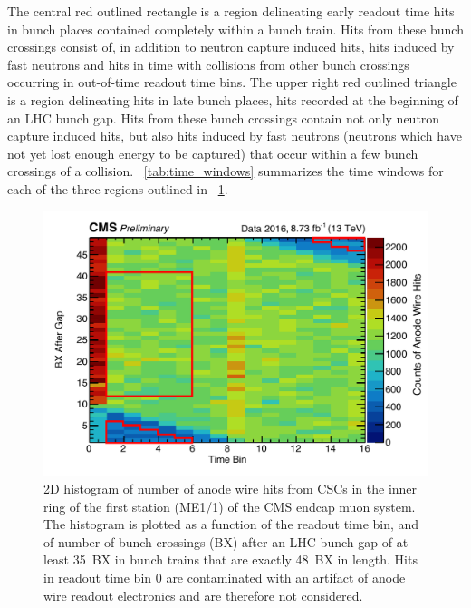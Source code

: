 The central red outlined rectangle is a region delineating early readout time hits in bunch places contained completely within a bunch train. Hits from these bunch crossings consist of, in addition to neutron capture induced hits, hits induced by fast neutrons and hits in time with \pp collisions from other bunch crossings occurring in out-of-time readout time bins. The upper right red outlined triangle is a region delineating hits in late bunch places, \ie hits recorded at the beginning of an LHC bunch gap. Hits from these bunch crossings contain not only neutron capture induced hits, but also hits induced by fast neutrons (neutrons which have not yet lost enough energy to be captured) that occur within a few bunch crossings of a \pp collision. \Tab~\ref{tab:time_windows} summarizes the time windows for each of the three regions outlined in \FigDot~\ref{fig:rainbow}.

\begin{figure}[htbp]
	\centering
	\includegraphics[width=\dummyFigWidth]{figures/neutron/Rainbow_wire_11.pdf}
  \caption[2D histogram of number of anode wire hits from CSCs in the inner ring of the first station (ME1/1) of the CMS endcap muon system.]{2D histogram of number of anode wire hits from CSCs in the inner ring of the first station (ME1/1) of the CMS endcap muon system. The histogram is plotted as a function of the readout time bin, and of number of bunch crossings (BX) after an LHC bunch gap of at least 35~BX in bunch trains that are exactly 48~BX in length. Hits in readout time bin 0 are contaminated with an artifact of anode wire readout electronics and are therefore not considered.}
	\label{fig:rainbow}
\end{figure}

